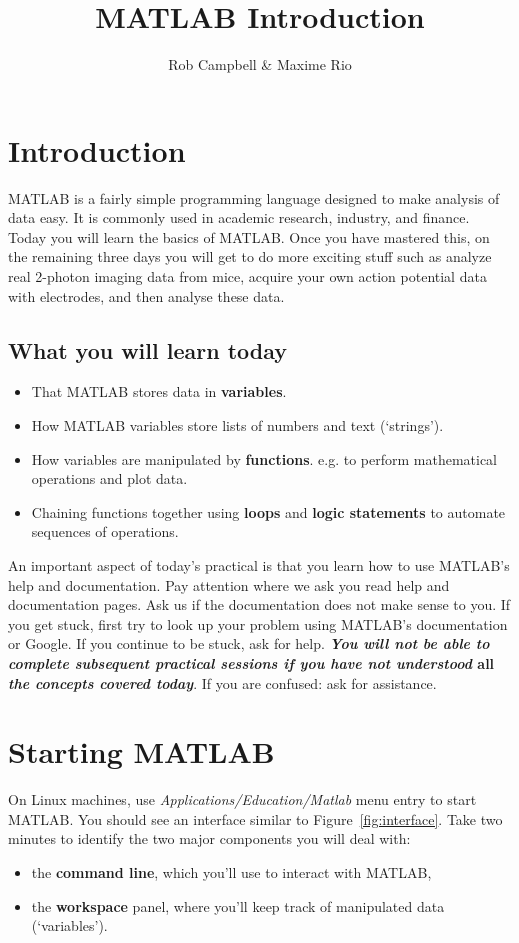 \documentclass{article}
\title{MATLAB Introduction}
\author{Rob Campbell \& Maxime Rio}
\date{}
\begin{document}
\maketitle


\section*{Introduction}

MATLAB is a fairly simple programming language designed to make analysis of data easy.
It is commonly used in academic research, industry, and finance.
Today you will learn the basics of MATLAB.
Once you have mastered this, on the remaining three days you will get to do more exciting stuff such as analyze real 2-photon imaging data from mice, acquire your own action potential data with electrodes, and then analyse these data.


\subsection*{What you will learn today}
\begin{itemize}
\item That MATLAB stores data in \textbf{variables}.
\item How MATLAB variables store lists of numbers and text (`strings').
\item How variables are manipulated by \textbf{functions}. e.g. to perform mathematical operations and plot data.
\item Chaining functions together using \textbf{loops} and \textbf{logic statements} to automate sequences of operations.
\end{itemize}

An important aspect of today's practical is that you learn how to use MATLAB's help and documentation.
Pay attention where we ask you read help and documentation pages. Ask us if the documentation does not make sense to you.
If you get stuck, first try to look up your problem using MATLAB's documentation or Google.
If you continue to be stuck, ask for help.
\textbf{\emph{You will not be able to complete subsequent practical sessions if you have not understood} all \emph{the concepts covered today}}.
If you are confused: ask for assistance.

\pagebreak
\section{Starting MATLAB}
On Linux machines, use \emph{Applications/Education/Matlab} menu entry to start MATLAB.
You should see an interface similar to Figure~\ref{fig:interface}.
Take two minutes to identify the two major components you will deal with:
\begin{itemize}
\item the \textbf{command line}, which you'll use to interact with MATLAB,
\item the \textbf{workspace} panel, where you'll keep track of manipulated data (`variables').
\end{itemize}
\end{document}
